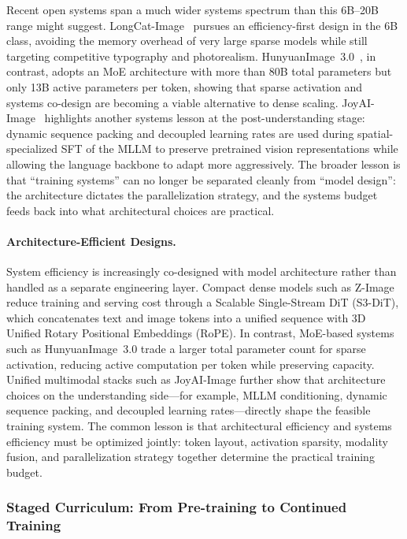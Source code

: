 Recent open systems span a much wider systems spectrum than this 6B--20B range might suggest. LongCat-Image~\citep{team2025longcat} pursues an efficiency-first design in the 6B class, avoiding the memory overhead of very large sparse models while still targeting competitive typography and photorealism. HunyuanImage~3.0~\citep{cao2025hunyuanimage}, in contrast, adopts an MoE architecture with more than 80B total parameters but only 13B active parameters per token, showing that sparse activation and systems co-design are becoming a viable alternative to dense scaling. JoyAI-Image~\citep{jdjoyaiimage} highlights another systems lesson at the post-understanding stage: dynamic sequence packing and decoupled learning rates are used during spatial-specialized SFT of the MLLM to preserve pretrained vision representations while allowing the language backbone to adapt more aggressively. The broader lesson is that ``training systems'' can no longer be separated cleanly from ``model design'': the architecture dictates the parallelization strategy, and the systems budget feeds back into what architectural choices are practical.

\paragraph{Architecture-Efficient Designs.}
System efficiency is increasingly co-designed with model architecture rather than handled as a separate engineering layer. Compact dense models such as Z-Image reduce training and serving cost through a Scalable Single-Stream DiT (S3-DiT), which concatenates text and image tokens into a unified sequence with 3D Unified Rotary Positional Embeddings (RoPE). In contrast, MoE-based systems such as HunyuanImage~3.0 trade a larger total parameter count for sparse activation, reducing active computation per token while preserving capacity. Unified multimodal stacks such as JoyAI-Image further show that architecture choices on the understanding side---for example, MLLM conditioning, dynamic sequence packing, and decoupled learning rates---directly shape the feasible training system. The common lesson is that architectural efficiency and systems efficiency must be optimized jointly: token layout, activation sparsity, modality fusion, and parallelization strategy together determine the practical training budget.


\subsubsection{Staged Curriculum: From Pre-training to Continued Training}
\label{subsec:curriculum}

